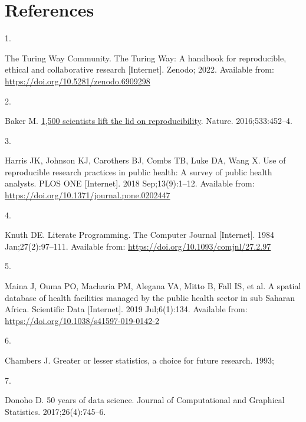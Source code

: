 \documentclass[
  letterpaper,
  DIV=11,
  numbers=noendperiod,
  oneside]{scrreprt}
\newlength{\cslhangindent}
\newlength{\csllabelwidth}
\newlength{\cslentryspacingunit} %
\newenvironment{CSLReferences}[2] %
 {%
  \setlength{\parindent}{0pt}
  \ifodd #1
  \let\oldpar\par
  \def\par{\hangindent=\cslhangindent\oldpar}
  \fi
  \setlength{\parskip}{#2\cslentryspacingunit}
 }%
 {}
\newcommand{\CSLLeftMargin}[1]{\parbox[t]{\csllabelwidth}{#1}}
\newcommand{\CSLRightInline}[1]{\parbox[t]{\linewidth - \csllabelwidth}{#1}\break}
\begin{document}

\hypertarget{references-2}{%
\chapter*{References}\label{references-2}}


\hypertarget{refs}{}
\begin{CSLReferences}{0}{0}
\leavevmode{}%
\CSLLeftMargin{1. }%
\CSLRightInline{The Turing Way Community. {The Turing Way: A handbook
for reproducible, ethical and collaborative research} {[}Internet{]}.
Zenodo; 2022. Available from:
\url{https://doi.org/10.5281/zenodo.6909298}}

\leavevmode{}%
\CSLLeftMargin{2. }%
\CSLRightInline{Baker M. \href{https://doi.org/10.1038/533452a}{1,500
scientists lift the lid on reproducibility}. Nature. 2016;533:452--4. }

\leavevmode{}%
\CSLLeftMargin{3. }%
\CSLRightInline{Harris JK, Johnson KJ, Carothers BJ, Combs TB, Luke DA,
Wang X. Use of reproducible research practices in public health: {A}
survey of public health analysts. PLOS ONE {[}Internet{]}. 2018
Sep;13(9):1--12. Available from:
\url{https://doi.org/10.1371/journal.pone.0202447}}

\leavevmode{}%
\CSLLeftMargin{4. }%
\CSLRightInline{Knuth DE. {Literate Programming}. The Computer Journal
{[}Internet{]}. 1984 Jan;27(2):97--111. Available from:
\url{https://doi.org/10.1093/comjnl/27.2.97}}

\leavevmode{}%
\CSLLeftMargin{5. }%
\CSLRightInline{Maina J, Ouma PO, Macharia PM, Alegana VA, Mitto B, Fall
IS, et al. A spatial database of health facilities managed by the public
health sector in sub {Saharan} {Africa}. Scientific Data {[}Internet{]}.
2019 Jul;6(1):134. Available from:
\url{https://doi.org/10.1038/s41597-019-0142-2}}

\leavevmode{}%
\CSLLeftMargin{6. }%
\CSLRightInline{Chambers J. Greater or lesser statistics, a choice for
future research. 1993; }

\leavevmode{}%
\CSLLeftMargin{7. }%
\CSLRightInline{Donoho D. 50 years of data science. Journal of
Computational and Graphical Statistics. 2017;26(4):745--6. }


\end{CSLReferences}
\end{document}
